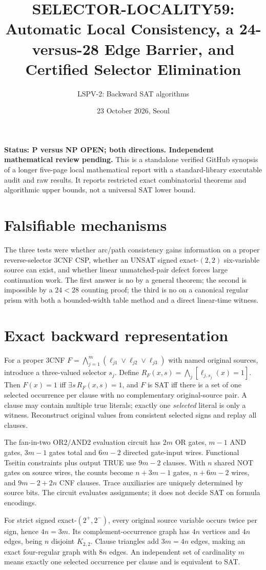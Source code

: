 \documentclass[10pt]{article}
\title{SELECTOR-LOCALITY59: Automatic Local Consistency, a 24-versus-28 Edge Barrier, and Certified Selector Elimination}
\author{LSPV-2: Backward SAT algorithms}
\date{23 October 2026, Seoul}
\begin{document}
\maketitle
\noindent\textbf{Status: P versus NP OPEN; both directions. Independent mathematical review pending.} This is a standalone verified GitHub synopsis of a longer five-page local mathematical report with a standard-library executable audit and raw results. It reports restricted exact combinatorial theorems and algorithmic upper bounds, not a universal SAT lower bound.

\section{Falsifiable mechanisms}
The three tests were whether arc/path consistency gains information on a proper reverse-selector 3CNF CSP, whether an UNSAT signed exact-$(2,2)$ six-variable source can exist, and whether linear unmatched-pair defect forces large continuation work. The first answer is no by a general theorem; the second is impossible by a $24<28$ counting proof; the third is no on a canonical regular prism with both a bounded-width table method and a direct linear-time witness.

\section{Exact backward representation}
For a proper 3CNF $F=\bigwedge_{j=1}^m(\ell_{j1}\vee\ell_{j2}\vee\ell_{j3})$ with named original sources, introduce a three-valued selector $s_j$. Define $R_F(x,s)=\bigwedge_j[\ell_{j,s_j}(x)=1]$. Then $F(x)=1$ iff $\exists s\,R_F(x,s)=1$, and $F$ is SAT iff there is a set of one selected occurrence per clause with no complementary original-source pair. A clause may contain multiple true literals; exactly one \emph{selected} literal is only a witness. Reconstruct original values from consistent selected signs and replay all clauses.

The fan-in-two $\mathrm{OR2}/\mathrm{AND2}$ evaluation circuit has $2m$ OR gates, $m-1$ AND gates, $3m-1$ gates total and $6m-2$ directed gate-input wires. Functional Tseitin constraints plus output TRUE use $9m-2$ clauses. With $n$ shared NOT gates on source wires, the counts become $n+3m-1$ gates, $n+6m-2$ wires, and $9m-2+2n$ CNF clauses. Trace auxiliaries are uniquely determined by source bits. The circuit evaluates assignments; it does not decide SAT on formula encodings.

For strict signed exact-$(2^+,2^-)$, every original source variable occurs twice per sign, hence $4n=3m$. Its complement-occurrence graph has $4n$ vertices and $4n$ edges, being $n$ disjoint $K_{2,2}$. Clause triangles add $3m=4n$ edges, making an exact four-regular graph with $8n$ edges. An independent set of cardinality $m$ means exactly one selected occurrence per clause and is equivalent to SAT.
\end{document}
